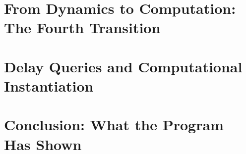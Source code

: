 \documentclass[12pt, oneside]{book}
\theoremstyle{definition}
\theoremstyle{remark}
\begin{document}



\chapter*{From Dynamics to Computation: The Fourth Transition}
\label{interstitial:two-to-three}




\chapter{Delay Queries and Computational Instantiation}
\label{chap:paper-three}




\chapter*{Conclusion: What the Program Has Shown}
\label{chap:conclusion}



\backmatter
\end{document}
